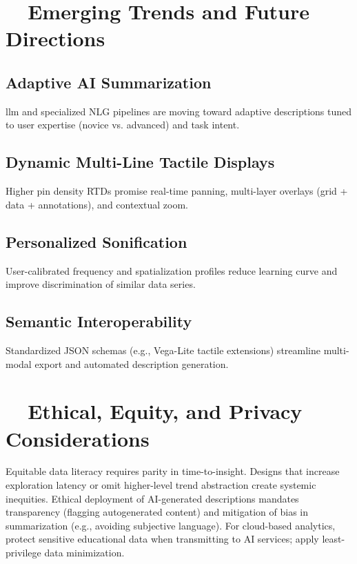 \section{~~Emerging Trends and Future Directions}\label{ch13:sec:future-directions}
\subsection{Adaptive AI Summarization}
\gls{llm} and specialized NLG pipelines are moving toward adaptive descriptions tuned to user expertise (novice vs. advanced) and task intent\supercite{VisText, Lundgard2022Accessible}.
\subsection{Dynamic Multi-Line Tactile Displays}
Higher pin density RTDs promise real-time panning, multi-layer overlays (grid + data + annotations), and contextual zoom.
\subsection{Personalized Sonification}
User-calibrated frequency and spatialization profiles reduce learning curve and improve discrimination of similar data series\supercite{Trayford2023STRAUSS}.
\subsection{Semantic Interoperability}
Standardized JSON schemas (e.g., Vega-Lite tactile extensions) streamline multi-modal export and automated description generation\supercite{TactileVegaLite}.

\section{~~Ethical, Equity, and Privacy Considerations}\label{ch13:sec:ethics-equity}
Equitable data literacy requires parity in time-to-insight. Designs that increase exploration latency or omit higher-level trend abstraction create systemic inequities. Ethical deployment of AI-generated descriptions mandates transparency (flagging autogenerated content) and mitigation of bias in summarization (e.g., avoiding subjective language). For cloud-based analytics, protect sensitive educational data when transmitting to AI services; apply least-privilege data minimization.

